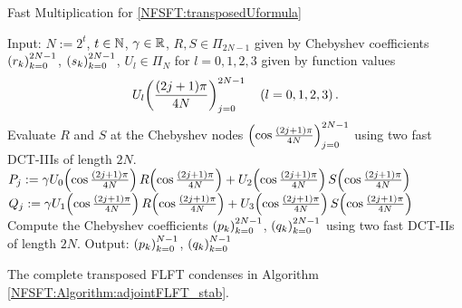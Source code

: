 \begin{algorithm}[htb]
  \caption{Fast Multiplication for \eqref{NFSFT:transposedUformula}}
  \label{NFSFT:Algorithm:Utransposed}
  \begin{algorithmic}
    \STATE Input:  $N := 2^t$, $t \in \mathbb{N}$, $\gamma \in \mathbb{R}$, $R,S \in \Pi_{2N-1}$ given by Chebyshev coefficients \\
    \STATE {} $\left(r_{k}\right)_{k=0}^{2N-1}$, $\left(s_{k}\right)_{k=0}^{2N-1}$, $U_{l} \in \Pi_{N}$ for $l=0,1,2,3$ 
      given by function values
      \[U_{l}{\hspace{-0.4ex}}\left(\frac{(2j+1)\pi}{4N}\right)_{j = 0}^{2N-1} \quad \left(l=0,1,2,3\right).\] 
    \STATE Evaluate $R$ and $S$ at the Chebyshev nodes $\left(\cos \frac{(2j+1)\pi}{4N}\right)_{j = 0}^{2N-1}$
      using two fast DCT-IIIs of length $2N$.
    \STATE 
      \STATE $P_{j} := \gamma U_{0}{\hspace{-0.4ex}}\left(\cos \frac{(2j+1)\pi}{4N}\right) R{\hspace{-0.4ex}}\left(\cos \frac{(2j+1)\pi}{4N}\right) +
                              U_{2}{\hspace{-0.4ex}}\left(\cos \frac{(2j+1)\pi}{4N}\right) S{\hspace{-0.4ex}}\left(\cos \frac{(2j+1)\pi}{4N}\right)$
      \STATE $Q_{j} := \gamma U_{1}{\hspace{-0.4ex}}\left(\cos \frac{(2j+1)\pi}{4N}\right) R{\hspace{-0.4ex}}\left(\cos \frac{(2j+1)\pi}{4N}\right) +
                              U_{3}{\hspace{-0.4ex}}\left(\cos \frac{(2j+1)\pi}{4N}\right) S{\hspace{-0.4ex}}\left(\cos \frac{(2j+1)\pi}{4N}\right)$
    \ENDFOR
    \STATE
    \STATE Compute the Chebyshev coefficients $\left(p_{k}\right)_{k=0}^{2N-1}$, $\left(q_{k}\right)_{k=0}^{2N-1}$ 
      using two fast DCT-IIs of length $2N$.
    \STATE
    \STATE Output: $\left(p_{k}\right)_{k=0}^{N-1}$, $\left(q_{k}\right)_{k=0}^{N-1}$
  \end{algorithmic}
\end{algorithm}  
The complete transposed FLFT condenses in Algorithm \ref{NFSFT:Algorithm:adjointFLFT_stab}.
